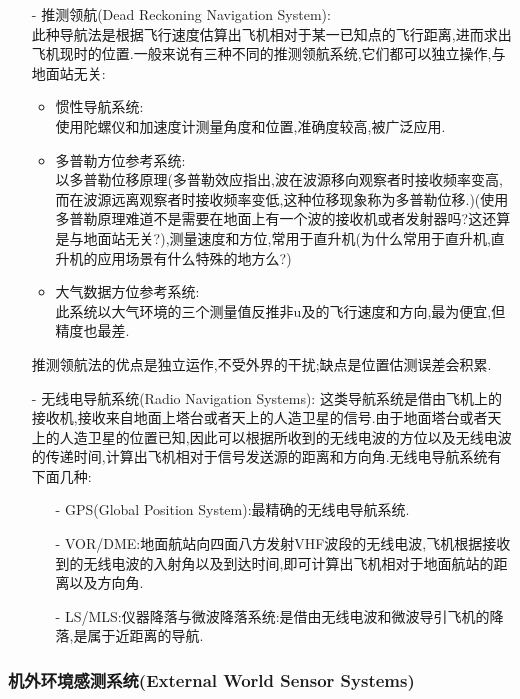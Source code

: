 \documentclass[9pt, oneside]{book}
\begin{document}
\begin{itemize}
    \item [-] 推测领航(Dead Reckoning Navigation System): \\
        此种导航法是根据飞行速度估算出飞机相对于某一已知点的飞行距离,进而求出飞机现时的位置.一般来说有三种不同的推测领航系统,它们都可以独立操作,与地面站无关:
        \begin{itemize}
            \item 惯性导航系统: \\
                使用陀螺仪和加速度计测量角度和位置,准确度较高,被广泛应用.
            \item 多普勒方位参考系统: \\
                以多普勒位移原理(多普勒效应指出,波在波源移向观察者时接收频率变高,而在波源远离观察者时接收频率变低,这种位移现象称为多普勒位移.)\textcolor[rgb]{1,0,0}{(使用多普勒原理难道不是需要在地面上有一个波的接收机或者发射器吗?这还算是与地面站无关?)},测量速度和方位,常用于直升机\textcolor[rgb]{1,0,0}{(为什么常用于直升机,直升机的应用场景有什么特殊的地方么?)}
            \item 大气数据方位参考系统: \\
                此系统以大气环境的三个测量值反推非u及的飞行速度和方向,最为便宜,但精度也最差.
        \end{itemize}
        推测领航法的优点是独立运作,不受外界的干扰;缺点是位置估测误差会积累.
    \item [-] 无线电导航系统(Radio Navigation Systems):
        这类导航系统是借由飞机上的接收机,接收来自地面上塔台或者天上的人造卫星的信号.由于地面塔台或者天上的人造卫星的位置已知,因此可以根据所收到的无线电波的方位以及无线电波的传递时间,计算出飞机相对于信号发送源的距离和方向角.无线电导航系统有下面几种:
        \begin{itemize}
            \item [-] GPS(Global Position System):最精确的无线电导航系统.
            \item [-] VOR/DME:地面航站向四面八方发射VHF波段的无线电波,飞机根据接收到的无线电波的入射角以及到达时间,即可计算出飞机相对于地面航站的距离以及方向角.
            \item [-] LS/MLS:仪器降落与微波降落系统:是借由无线电波和微波导引飞机的降落,是属于近距离的导航.
        \end{itemize}
\end{itemize}

\subsubsection{机外环境感测系统(External World Sensor Systems)}
\end{document}
